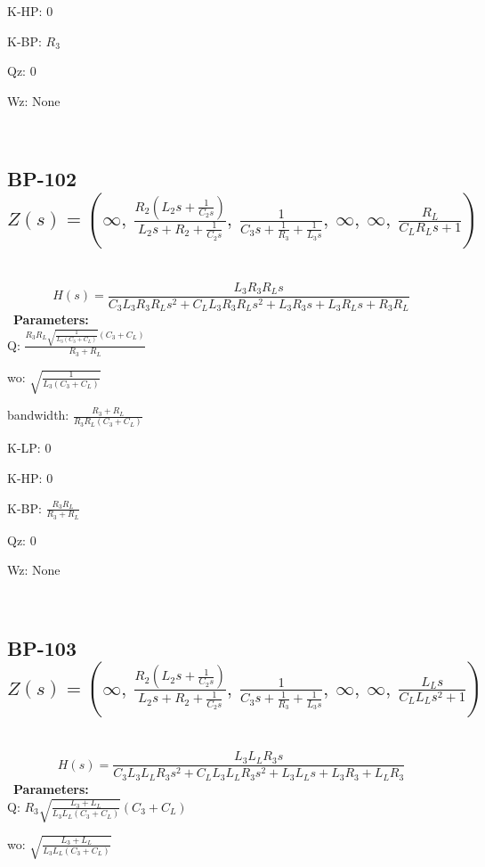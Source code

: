 \documentclass{article}
\begin{document}
K-HP: $0$\ 

K-BP: $R_{3}$\ 

Qz: $0$\ 

Wz: $\text{None}$\ 

\ 

\subsection{BP-102 $Z(s) = \left( \infty, \  \frac{R_{2} \left(L_{2} s + \frac{1}{C_{2} s}\right)}{L_{2} s + R_{2} + \frac{1}{C_{2} s}}, \  \frac{1}{C_{3} s + \frac{1}{R_{3}} + \frac{1}{L_{3} s}}, \  \infty, \  \infty, \  \frac{R_{L}}{C_{L} R_{L} s + 1}\right)$ } \ 
\textbf{\[H(s) = \frac{L_{3} R_{3} R_{L} s}{C_{3} L_{3} R_{3} R_{L} s^{2} + C_{L} L_{3} R_{3} R_{L} s^{2} + L_{3} R_{3} s + L_{3} R_{L} s + R_{3} R_{L}}\] } \ 
\textbf{Parameters:}\\ 

Q: $\frac{R_{3} R_{L} \sqrt{\frac{1}{L_{3} \left(C_{3} + C_{L}\right)}} \left(C_{3} + C_{L}\right)}{R_{3} + R_{L}}$\ 

wo: $\sqrt{\frac{1}{L_{3} \left(C_{3} + C_{L}\right)}}$\ 

bandwidth: $\frac{R_{3} + R_{L}}{R_{3} R_{L} \left(C_{3} + C_{L}\right)}$\ 

K-LP: $0$\ 

K-HP: $0$\ 

K-BP: $\frac{R_{3} R_{L}}{R_{3} + R_{L}}$\ 

Qz: $0$\ 

Wz: $\text{None}$\ 

\ 

\subsection{BP-103 $Z(s) = \left( \infty, \  \frac{R_{2} \left(L_{2} s + \frac{1}{C_{2} s}\right)}{L_{2} s + R_{2} + \frac{1}{C_{2} s}}, \  \frac{1}{C_{3} s + \frac{1}{R_{3}} + \frac{1}{L_{3} s}}, \  \infty, \  \infty, \  \frac{L_{L} s}{C_{L} L_{L} s^{2} + 1}\right)$ } \ 
\textbf{\[H(s) = \frac{L_{3} L_{L} R_{3} s}{C_{3} L_{3} L_{L} R_{3} s^{2} + C_{L} L_{3} L_{L} R_{3} s^{2} + L_{3} L_{L} s + L_{3} R_{3} + L_{L} R_{3}}\] } \ 
\textbf{Parameters:}\\ 

Q: $R_{3} \sqrt{\frac{L_{3} + L_{L}}{L_{3} L_{L} \left(C_{3} + C_{L}\right)}} \left(C_{3} + C_{L}\right)$\ 

wo: $\sqrt{\frac{L_{3} + L_{L}}{L_{3} L_{L} \left(C_{3} + C_{L}\right)}}$\ 
\end{document}
